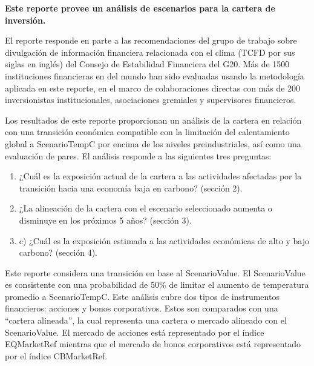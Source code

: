 \documentclass[10pt,table]{article}\usepackage[]{graphicx}\usepackage[]{color}
\begin{document}
	\begin{multicols}{2}
		\textbf{Este reporte provee un análisis de escenarios para la cartera de inversión. } 
		
		El reporte responde en parte a las recomendaciones del grupo de trabajo sobre divulgación de información financiera relacionada con el clima (TCFD por sus siglas en inglés) del Consejo de Estabilidad Financiera del G20. Más de 1500 instituciones financieras en del mundo han sido evaluadas usando la metodología aplicada en este reporte, en el marco de colaboraciones directas con más de 200 inversionistas institucionales, asociaciones gremiales y supervisores financieros.
		
		Los resultados de este reporte proporcionan un análisis de la cartera en relación con una transición económica compatible con la limitación del calentamiento global a ScenarioTemp\degree C por encima de los niveles preindustriales, así como una evaluación de pares. El análisis responde a las siguientes tres preguntas:
		
		\begin{enumerate}
			\item{¿Cuál es la exposición actual de la cartera a las actividades afectadas por la transición hacia una economía baja en carbono? (sección 2).}
			\item{¿La alineación de la cartera con el escenario seleccionado aumenta o disminuye en los próximos 5 años? (sección 3).}
			\item{c)	¿Cuál es la exposición estimada a las actividades económicas de alto y bajo carbono? (sección 4).}
		\end{enumerate}
		
		Este reporte considera una transición en base al ScenarioValue. El ScenarioValue es consistente con una probabilidad de 50\% de limitar el aumento de temperatura promedio a ScenarioTemp\degree C. Este análisis cubre dos tipos de instrumentos financieros: acciones y bonos corporativos. Estos son comparados con una “cartera alineada”, la cual representa una cartera o mercado alineado con el ScenarioValue. El mercado de acciones está representado por el índice EQMarketRef mientras que el mercado de bonos corporativos está representado por el índice CBMarketRef. \columnbreak
		
		
		

\end{multicols}
\end{document}
